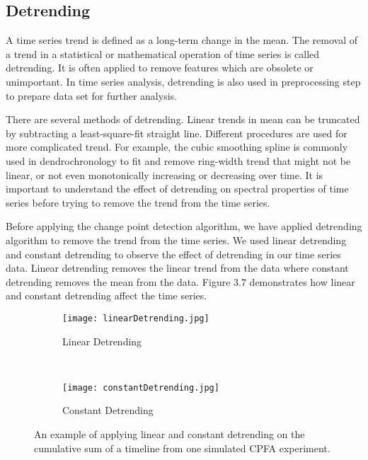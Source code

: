  \subsection{\label{Detrending}Detrending}
 A time series trend is defined as a long-term change in the mean. The removal of a trend in a statistical or mathematical operation of time series is called detrending. It is often applied to remove features which are obsolete or unimportant. In time series analysis, detrending is also used in preprocessing step to prepare data set for further analysis.\par 
 There are several methods of detrending. Linear trends in mean can be truncated by subtracting a least-square-fit straight line. Different procedures are used for more complicated trend. For example, the cubic smoothing spline is commonly used in dendrochronology to fit and remove ring-width trend that might not be linear, or not even monotonically increasing or decreasing over time. It is important to understand the effect of detrending on spectral properties of time series before trying to remove the trend from the time series.\par 
 Before applying the change point detection algorithm, we have applied detrending algorithm to remove the trend from the time series. We used linear detrending and constant detrending to observe the effect of detrending in our time series data. Linear detrending removes the linear trend from the data where constant detrending removes the mean from the data. Figure $3.7$ demonstrates how linear and constant detrending affect the time series.\par
 \begin{figure}[H]
 	\begin{subfigure}{\textwidth}
 		\centering
 		\texttt{[image: linearDetrending.jpg]}
 		\caption{Linear Detrending}
 		\label{fig:Linear}
 	\end{subfigure}%
 	\\
 	\begin{subfigure}{\textwidth}
 		\centering
 		\texttt{[image: constantDetrending.jpg]}
 		\caption{Constant Detrending}
 		\label{fig:Constant}
 	\end{subfigure}
 	\caption{An example of applying linear and constant detrending on the cumulative sum of a timeline from one simulated CPFA experiment.}
 	\label{fig:fig}
 \end{figure}
 \clearpage
